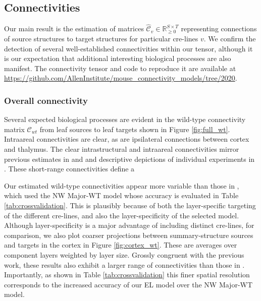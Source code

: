 \newpage

\subsection{Connectivities}

Our main result is the estimation of matrices $\hat {\mathcal C}_v \in \mathbb R_{\geq 0}^{S \times T}$ representing connections of source structures to target structures for particular cre-lines $v$. 
We confirm the detection of several well-established connectivities within our tensor, although it is our expectation that additional interesting biological processes are also manifest.
The connectivity tensor and code to reproduce it are available at \url{https://github.com/AllenInstitute/mouse_connectivity_models/tree/2020}.

\subsubsection{Overall connectivity}

Several expected biological processes are evident in the wild-type connectivity matrix $\mathcal C_{wt}$ from leaf sources to leaf targets shown in Figure \ref{fig:full_wt}.
Intraareal connectivities are clear, as are ipsilateral connections between cortex and thalymus.
The clear intrastructural and intraareal connectivities mirror previous estimates in \citet{Oh2014-kh} and \citet{Knox2019-ot} and descriptive depictions of individual experiments in \citet{Harris2019-mr}.
These short-range connectivities define a 

Our estimated wild-type connectivities appear more variable than those in \citet{Knox2019-ot}, which used the NW Major-WT model whose accuracy is evaluated in Table \ref{tab:crossvalidation}.
This is plausibly because of both the layer-specific targeting of the different cre-lines, and also the layer-specificity of the selected model.
Although layer-specificity is a major advantage of including distinct cre-lines, for comparison, we also plot coarser projections between summary-structure sources and targets in the cortex in Figure \ref{fig:cortex_wt}.
These are averages over component layers weighted by layer size.
Grossly congruent with the previous work, these results also exhibit a larger range of connectivities than those in \citet{Knox2019-ot}.
Importantly, as shown in Table \ref{tab:crossvalidation} this finer spatial resolution corresponds to the increased accuracy of our EL model over the NW Major-WT model.

